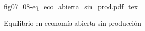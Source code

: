 \begin{figure}[h]
\centering
\def\svgwidth{0.5\textwidth}
{fig07_08-eq_eco_abierta_sin_prod.pdf_tex}
\caption{Equilibrio en economía abierta sin producción}
\label{fig07_08-eq_eco_abierta_sin_prod}
\end{figure}